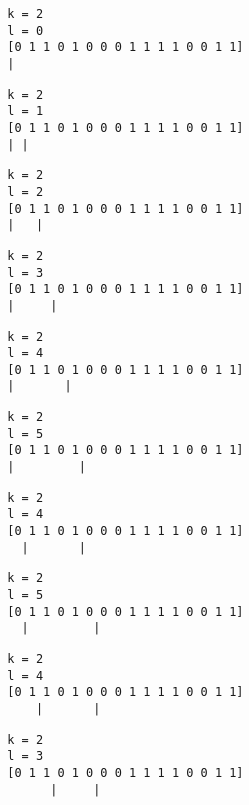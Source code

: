 { \begin{verbatim}
        k = 2
        l = 0
        [0 1 1 0 1 0 0 0 1 1 1 1 0 0 1 1]
        |
\end{verbatim} }

{ \begin{verbatim}
        k = 2
        l = 1
        [0 1 1 0 1 0 0 0 1 1 1 1 0 0 1 1]
        | |
\end{verbatim} }

{ \begin{verbatim}
        k = 2
        l = 2
        [0 1 1 0 1 0 0 0 1 1 1 1 0 0 1 1]
        |   |
\end{verbatim} }

{ \begin{verbatim}
        k = 2
        l = 3
        [0 1 1 0 1 0 0 0 1 1 1 1 0 0 1 1]
        |     |
\end{verbatim} }

{ \begin{verbatim}
        k = 2
        l = 4
        [0 1 1 0 1 0 0 0 1 1 1 1 0 0 1 1]
        |       |
\end{verbatim} }

{ \begin{verbatim}
        k = 2
        l = 5
        [0 1 1 0 1 0 0 0 1 1 1 1 0 0 1 1]
        |         |
\end{verbatim} }

{ \begin{verbatim}
        k = 2
        l = 4
        [0 1 1 0 1 0 0 0 1 1 1 1 0 0 1 1]
          |       |
\end{verbatim} }

{ \begin{verbatim}
        k = 2
        l = 5
        [0 1 1 0 1 0 0 0 1 1 1 1 0 0 1 1]
          |         |
\end{verbatim} }

{ \begin{verbatim}
        k = 2
        l = 4
        [0 1 1 0 1 0 0 0 1 1 1 1 0 0 1 1]
            |       |
\end{verbatim} }

{ \begin{verbatim}
        k = 2
        l = 3
        [0 1 1 0 1 0 0 0 1 1 1 1 0 0 1 1]
              |     |
\end{verbatim} }

